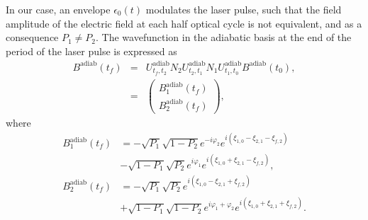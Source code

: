 \documentclass[9pt,twocolumn,twoside]{osajnl}
\begin{document}
In our case, an envelope $\epsilon_0 (t)$ modulates the laser pulse, such that the field amplitude of the electric field at each half optical cycle is not equivalent, and as a consequence $P_{1}\ne P_{2}$. %
The wavefunction in the adiabatic basis at the end of the period of the laser pulse is expressed as 
\begin{eqnarray}\label{Prob_final_factor}
	B^{\mathrm{adiab}}(t_f)&=&U^{\mathrm{adiab}}_{t_{f},t_{2}}N_{2}U^{\mathrm{adiab}}_{t_{2},t_{1}}N_{1}U^{\mathrm{adiab}}_{t_{1},t_0} B^{\mathrm{adiab}}(t_0),\\ \nonumber
	&=&
	\begin{pmatrix}
	B^{\mathrm{adiab}}_{1}(t_f) \\
	B^{\mathrm{adiab}}_{2}(t_f)
	\end{pmatrix},
\end{eqnarray}
where
%
\begin{align}
B^{\mathrm{adiab}}_{1}(t_f)&=
		-\sqrt{P_1} \sqrt{1-P_{2}}e^{-i\varphi_{2}}e^{i(\xi_{1,0}-\xi_{2,1}-\xi_{f,2})}\nonumber \\
		&   - \sqrt{1-P_1}\sqrt{P_{2}}e^{i\varphi_1}e^{i(\xi_{1,0}+\xi_{2,1}-\xi_{f,2})},
		 \\  
B^{\mathrm{adiab}}_{2}(t_f)&=		 
		 - \sqrt{P_1}\sqrt{P_{2}}e^{i(\xi_{1,0}-\xi_{2,1}+\xi_{f,2})} \nonumber \\
		 & + \sqrt{1-P_1} \sqrt{1-P_{2}}e^{i\varphi_1+\varphi_{2}}e^{i(\xi_{1,0}+\xi_{2,1}+\xi_{f,2})}.
\end{align}
\end{document}
